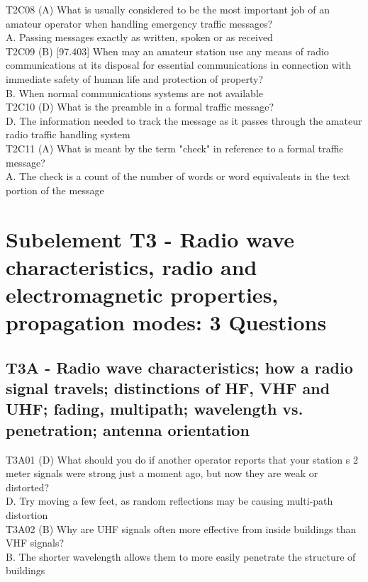 \documentclass[12pt,letterpaper]{report}
\begin{document}
T2C08 (A) What is usually considered to be the most important job of an amateur operator when handling emergency traffic messages?\\
A. Passing messages exactly as written, spoken or as received\\

T2C09 (B) [97.403] When may an amateur station use any means of radio communications at its disposal for essential communications in connection with immediate safety of human life and protection of property?\\
B. When normal communications systems are not available\\

T2C10 (D) What is the preamble in a formal traffic message?\\
D. The information needed to track the message as it passes through the amateur radio traffic handling system\\

T2C11 (A) What is meant by the term "check" in reference to a formal traffic message?\\
A. The check is a count of the number of words or word equivalents in the text portion of the message\\

\chapter{Subelement T3 - Radio wave characteristics, radio and electromagnetic properties, propagation modes: 3 Questions}

\section{T3A - Radio wave characteristics; how a radio signal travels; distinctions of HF, VHF and UHF; fading, multipath; wavelength vs. penetration; antenna orientation}

T3A01 (D) What should you do if another operator reports that your station s 2 meter signals were strong just a moment ago, but now they are weak or distorted?\\
D. Try moving a few feet, as random reflections may be causing multi-path distortion\\

T3A02 (B) Why are UHF signals often more effective from inside buildings than VHF signals?\\
B. The shorter wavelength allows them to more easily penetrate the structure of buildings\\
\end{document}
